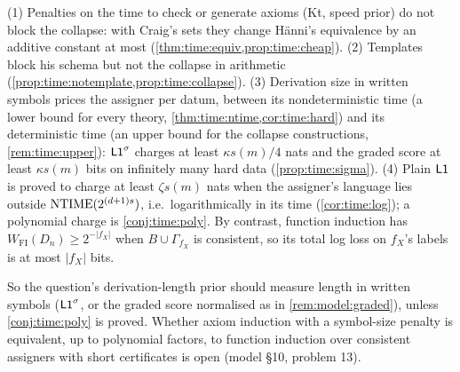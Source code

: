 \begin{remark}\label{rem:time:summary}
(1) Penalties on the time to check or generate axioms (Kt, speed prior) do not block the collapse: with Craig's sets they change H\"anni's equivalence by an additive constant at most (\cref{thm:time:equiv,prop:time:cheap}). (2) Templates block his schema but not the collapse in arithmetic (\cref{prop:time:notemplate,prop:time:collapse}). (3) Derivation size in written symbols prices the assigner per datum, between its nondeterministic time (a lower bound for every theory, \cref{thm:time:ntime,cor:time:hard}) and its deterministic time (an upper bound for the collapse constructions, \cref{rem:time:upper}): $\mathord{\mathsf{L1}}^{\sigma}$ charges at least $\kappa s(m)/4$ nats and the graded score at least $\kappa s(m)$ bits on infinitely many hard data (\cref{prop:time:sigma}). (4) Plain $\mathord{\mathsf{L1}}$ is proved to charge at least $\zeta s(m)$ nats when the assigner's language lies outside $\mathrm{NTIME}(2^{(d+1)s})$, i.e.\ logarithmically in its time (\cref{cor:time:log}); a polynomial charge is \cref{conj:time:poly}. By contrast, function induction has $W_{\mathrm{FI}}(D_n)\ge2^{-|f_X|}$ when $B\cup\Gamma_{f_X}$ is consistent, so its total log loss on $f_X$'s labels is at most $|f_X|$ bits.
\end{remark}

So the question's derivation-length prior should measure length in written symbols ($\mathord{\mathsf{L1}}^{\sigma}$, or the graded score normalised as in \cref{rem:model:graded}), unless \cref{conj:time:poly} is proved. Whether axiom induction with a symbol-size penalty is equivalent, up to polynomial factors, to function induction over consistent assigners with short certificates is open (model \S10, problem 13).


